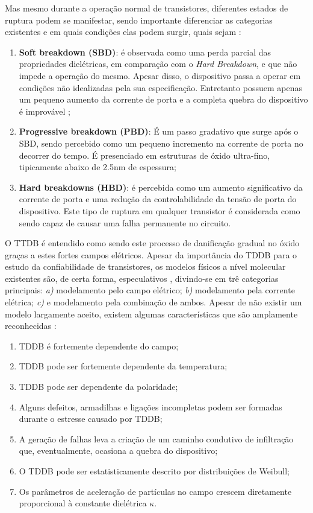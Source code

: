 Mas mesmo durante a operação normal de transistores, diferentes estados de ruptura podem se manifestar, sendo importante diferenciar as categorias existentes e em quais condições elas podem surgir, quais sejam \cite{Maricau2013}:
\begin{enumerate}
\item \textbf{Soft breakdown (SBD)}: é observada como uma perda parcial das propriedades dielétricas, em comparação com o \textit{Hard Breakdown}, e que n\~{a}o impede a operaç\~{a}o do mesmo. Apesar disso, o dispositivo passa a operar em condiç\~{o}es n\~{a}o idealizadas pela sua especificaç\~{a}o. Entretanto possuem apenas um pequeno aumento da corrente de porta e a completa quebra do dispositivo é improvável \cite{Maricau2013};
\item \textbf{Progressive breakdown (PBD)}: É um passo gradativo que surge após o SBD, sendo percebido como um pequeno incremento na corrente de porta no decorrer do tempo. É presenciado em estruturas de óxido ultra-fino, tipicamente abaixo de 2.5nm de espessura;
\item \textbf{Hard breakdowns (HBD)}: é percebida como um aumento significativo da corrente de porta e uma redução da controlabilidade da tensão de porta do dispositivo. Este tipo de ruptura em qualquer transistor é considerada como sendo capaz de causar uma falha permanente no circuito.
\end{enumerate}
O TTDB é entendido como sendo este processo de danificação gradual no óxido graças a estes fortes campos elétricos.
Apesar da importância do TDDB para o estudo da confiabilidade de transistores, os modelos f\'{i}sicos a n\'{i}vel molecular existentes são, de certa forma, especulativos \cite{McPherson2012}, divindo-se em tr\^{e} categorias principais: \textit{a)} modelamento pelo campo el\'{e}trico; \textit{b)} modelamento pela corrente el\'{e}trica; \textit{c)} e modelamento pela combinação de ambos. Apesar de não existir um modelo largamente aceito, existem algumas características que são amplamente reconhecidas \cite{McPherson2012}:
\begin{enumerate}
\item TDDB é fortemente dependente do campo;
\item TDDB pode ser fortemente dependente da temperatura;
\item TDDB pode ser dependente da polaridade;
\item Alguns defeitos, armadilhas e ligações incompletas podem ser formadas durante o estresse causado por TDDB;
\item A geração de falhas leva a criação de um caminho condutivo de infiltração que, eventualmente, ocasiona a quebra do dispositivo;
\item O TDDB pode ser estatisticamente descrito por distribuições de Weibull;
\item Os parâmetros de aceleração de partículas no campo crescem diretamente proporcional à constante dielétrica $\kappa$.
\end{enumerate}
